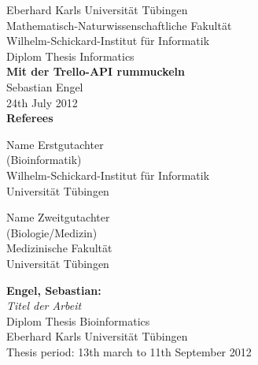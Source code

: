 \documentclass[twoside,12pt,a4paper]{report}
\begin{document}
 
\begin{titlepage}
 \begin{center}
  {\LARGE Eberhard Karls Universit\"at T\"ubingen}\\
  {\large Mathematisch-Naturwissenschaftliche Fakultät \\
Wilhelm-Schickard-Institut f\"ur Informatik\\[4cm]}
  {\huge Diplom Thesis Informatics\\[2cm]}
  {\Large\bf  Mit der Trello-API rummuckeln\\[1.5cm]}
 {\large Sebastian Engel}\\[0.5cm]
24th July 2012\\[4cm]
{\small\bf Referees}\\[0.5cm]
  \parbox{7cm}{\begin{center}{\large Name Erstgutachter}\\
   (Bioinformatik)\\
  {\footnotesize Wilhelm-Schickard-Institut f\"ur Informatik\\
	Universit\"at T\"ubingen}\end{center}}\hfill\parbox{7cm}{\begin{center}
  {\large Name Zweitgutachter}\\
  (Biologie/Medizin)\\
  {\footnotesize Medizinische Fakult\"at\\
	Universit\"at T\"ubingen}\end{center}
 }
  \end{center}
\end{titlepage}


\thispagestyle{empty}
\vspace*{\fill}
\begin{minipage}{11.2cm}
\textbf{Engel, Sebastian:}\\
\emph{Titel der Arbeit}\\ Diplom Thesis Bioinformatics\\
Eberhard Karls Universit\"at T\"ubingen\\
Thesis period: 13th march to 11th September 2012
\end{minipage}
\newpage
\end{document}

